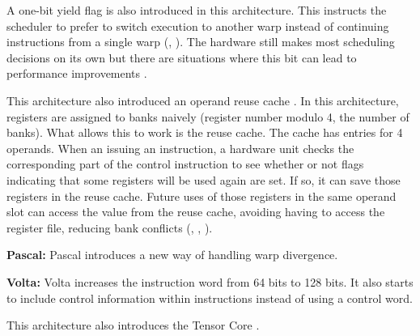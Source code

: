 A one-bit yield flag is also introduced in this architecture. This instructs
the scheduler to prefer to switch execution to another warp instead of continuing
instructions from a single warp (\cite{githubControlCodes}, \cite{jia2018dissecting}). 
The hardware still makes most scheduling decisions on its own but there are
situations where this bit can lead to performance improvements \cite{githubControlCodes}.

This architecture also introduced an operand reuse cache \cite{chipsandcheeseMaxwellNvidias}. 
In this architecture, registers are assigned to banks naively (register number modulo 4, the number of banks).
What allows this to work is the reuse cache. The cache has entries for 4 operands.
When an issuing an instruction, a hardware unit checks the corresponding part of the control instruction
to see whether or not flags indicating that some registers will be used again are set.
If so, it can save those registers in the reuse cache. Future uses of those
registers in the same operand slot can access the value from the reuse cache,
avoiding having to access the register file, reducing bank conflicts (\cite{jia2018dissecting}, \cite{githubSGEMM}, \cite{chipsandcheeseMaxwellNvidias}).

\textbf{Pascal:} Pascal introduces a new way of handling warp divergence.

\textbf{Volta:} Volta increases the instruction word from 64 bits to 128 bits.
It also starts to include control information within instructions instead of
using a control word\cite{jia2018dissecting}.

This architecture also introduces the Tensor Core \cite{sun2022dissecting}.

